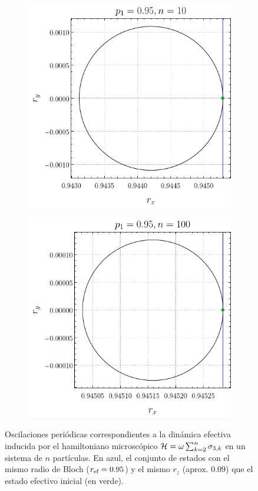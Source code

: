 \begin{figure}[ht!]
    \centering
    \begin{subfigure}{0.5\textwidth}
      \centering
      \includegraphics[width=0.9\linewidth]{chapter3/figures_separable/local_prefinv_eq_n=10_p=0.95.png}
    \end{subfigure}%
    \begin{subfigure}{0.5\textwidth}
      \centering
      \includegraphics[width=0.9\linewidth]{chapter3/figures_separable/local_prefinv_eq_n=100_p=0.95.png}
    \end{subfigure}
    \caption{Oscilaciones periódicas correspondientes a la dinámica efectiva inducida por el hamiltoniano microscópico $\mathcal{H}=\omega\sum_{k=2}^{n}\sigma_{3,k}$ en un sistema de $n$ partículas. En azul, el conjunto de estados con el mismo radio de Bloch ($r_{\text{ef}}=0.95$) y el mismo $r_{z}$ (aprox. $0.09$) que el estado efectivo inicial (en verde). \label{fig:OscilationsSameHam}}
\end{figure}

